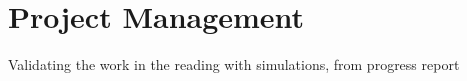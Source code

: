 \chapter{Project Management} \label{Chapter:seven}
Validating the work in the reading with simulations, from progress report